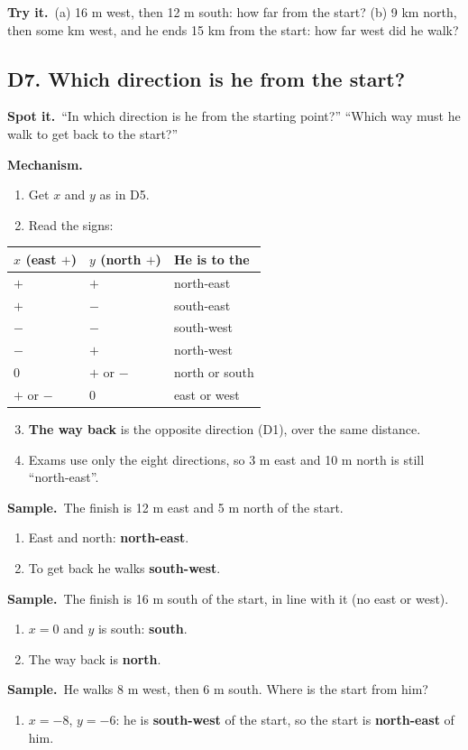 \documentclass[11pt,a4paper]{article}
\let\oldsubsection\subsection
\renewcommand{\subsection}{\needspace{9\baselineskip}\oldsubsection}
\newcommand{\spot}{\textbf{\color{ember}Spot it.}\ }
\newcommand{\mech}{\textbf{\color{ember}Mechanism.}\ }
\newif\ifkeepsamp
\newcommand{\samp}{\ifkeepsamp\needspace{4\baselineskip}\fi\textbf{\color{ember}Sample.}\ }
\newcommand{\tryit}[1]{\textbf{\color{ember}Try it.}\ #1}
\begin{document}
\tryit (a) 16 m west, then 12 m south: how far from the start? (b) 9 km north, then some km west, and he ends 15 km from the start: how far west did he walk?

\subsection{D7. Which direction is he from the start?}
\spot ``In which direction is he from the starting point?'' ``Which way must he walk to get back to the start?''

\mech
\begin{enumerate}
\item Get $x$ and $y$ as in D5.
\item Read the signs:
\end{enumerate}
\begin{center}\small\renewcommand{\arraystretch}{1.18}\setlength{\tabcolsep}{9pt}
\begin{tabular}{@{}lll@{}}
\toprule
\textbf{\color{slate}$x$ (east $+$)} & \textbf{\color{slate}$y$ (north $+$)} & \textbf{\color{slate}He is to the} \\ \midrule
$+$ & $+$ & north-east \\
$+$ & $-$ & south-east \\
$-$ & $-$ & south-west \\
$-$ & $+$ & north-west \\
0 & $+$ or $-$ & north or south \\
$+$ or $-$ & 0 & east or west \\
\bottomrule
\end{tabular}\end{center}
\begin{enumerate}
\setcounter{enumi}{2}
\item \textbf{The way back} is the opposite direction (D1), over the same distance.
\item Exams use only the eight directions, so 3 m east and 10 m north is still ``north-east''.
\end{enumerate}

\samp The finish is 12 m east and 5 m north of the start.
\begin{enumerate}
\item East and north: \textbf{north-east}.
\item To get back he walks \textbf{south-west}.
\end{enumerate}
\samp The finish is 16 m south of the start, in line with it (no east or west).
\begin{enumerate}
\item $x = 0$ and $y$ is south: \textbf{south}.
\item The way back is \textbf{north}.
\end{enumerate}
\samp He walks 8 m west, then 6 m south. Where is the start from him?
\begin{enumerate}
\item $x = -8$, $y = -6$: he is \textbf{south-west} of the start, so the start is \textbf{north-east} of him.
\end{enumerate}
\end{document}
